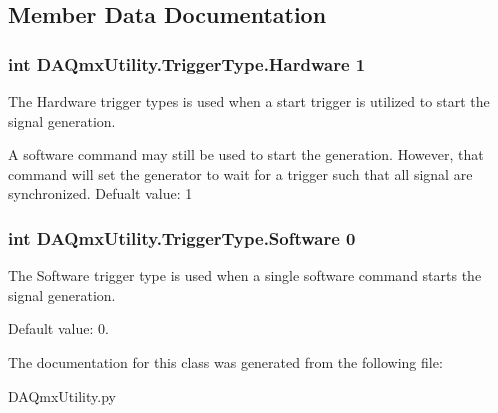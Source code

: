 \subsection{Member Data Documentation}
\hypertarget{class_d_a_qmx_utility_1_1_trigger_type_a52598eae33e8cc6021f037a0c79e8500}{
\subsubsection[{Hardware}]{\setlength{\rightskip}{0pt plus 5cm}int D\-A\-Qmx\-Utility.\-Trigger\-Type.\-Hardware 1\hspace{0.3cm}{\ttfamily [static]}}}\label{class_d_a_qmx_utility_1_1_trigger_type_a52598eae33e8cc6021f037a0c79e8500}


The Hardware trigger types is used when a start trigger is utilized to start the signal generation. 

A software command may still be used to start the generation. However, that command will set the generator to wait for a trigger such that all signal are synchronized. Defualt value\-: 1 \hypertarget{class_d_a_qmx_utility_1_1_trigger_type_a7427a18d64562c6221627ae8fc80da93}{
\subsubsection[{Software}]{\setlength{\rightskip}{0pt plus 5cm}int D\-A\-Qmx\-Utility.\-Trigger\-Type.\-Software 0\hspace{0.3cm}{\ttfamily [static]}}}\label{class_d_a_qmx_utility_1_1_trigger_type_a7427a18d64562c6221627ae8fc80da93}


The Software trigger type is used when a single software command starts the signal generation. 

Default value\-: 0. 

The documentation for this class was generated from the following file\-:\begin{DoxyCompactItemize}
\item 
D\-A\-Qmx\-Utility.\-py\end{DoxyCompactItemize}
